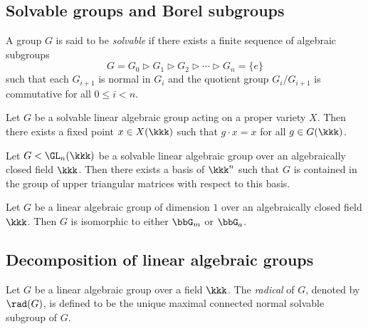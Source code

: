 \subsection{Solvable groups and Borel subgroups}

    \begin{definition}\label{def:solvable_group}
        A group \(G\) is said to be \emph{solvable} if there exists a finite sequence of algebraic subgroups
        \[
            G = G_0 \vartriangleright G_1 \vartriangleright G_2 \vartriangleright \cdots \vartriangleright G_n = \{e\}
        \]
        such that each \(G_{i+1}\) is normal in \(G_i\) and the quotient group \(G_i/G_{i+1}\) is commutative for all \(0 \leq i < n\).
    \end{definition}

    \begin{theorem}\label{prop:fixed_point_of_solvable_group_acting_on_proper_varieties}
        Let \(G\) be a solvable linear algebraic group acting on a proper variety \(X\). 
        Then there exists a fixed point \(x \in X(\kkk)\) such that \(g \cdot x = x\) for all \(g \in G(\kkk)\).
    \end{theorem}

    \begin{corollary}\label{prop:Lie-Kolchin_theorem}
        Let \(G < \GL_n(\kkk)\) be a solvable linear algebraic group over an algebraically closed field \(\kkk\). 
        Then there exists a basis of \(\kkk^n\) such that \(G\) is contained in the group of upper triangular matrices with respect to this basis.
    \end{corollary}

    \begin{theorem}\label{thm:classification_of_linear_alg_gp_of_dim1}
        Let \(G\) be a linear algebraic group of dimension \(1\) over an algebraically closed field \(\kkk\). 
        Then \(G\) is isomorphic to either \(\bbG_m\) or \(\bbG_a\).
    \end{theorem}



\subsection{Decomposition of linear algebraic groups}

    \begin{definition}\label{def:radical_of_linear_algebraic_group}
        Let \(G\) be a linear algebraic group over a field \(\kkk\). 
        The \emph{radical} of \(G\), denoted by \(\rad(G)\), is defined to be the unique maximal connected normal solvable subgroup of \(G\).
    \end{definition}

